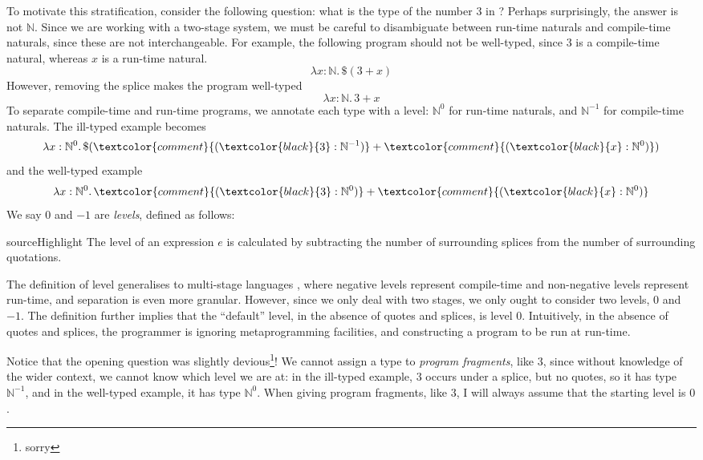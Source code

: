   To motivate this stratification, consider the following question: what is the type of the number $3$ in \sourceLang{}? Perhaps surprisingly, the answer is not $\mathbb{N}$. Since we are working with a two-stage system, we must be careful to disambiguate between run-time naturals and compile-time naturals, since these are not interchangeable. For example, the following program should not be well-typed, since $3$ is a compile-time natural, whereas $x$ is a run-time natural. 
  \[\lambda x: \mathbb{N}. \, \$(3 + x)\]
  However, removing the splice makes the program well-typed
  \[\lambda x: \mathbb{N}. \, 3 + x\]
  To separate compile-time and run-time programs, we annotate each type with a level: $\mathbb{N}^0$ for run-time naturals, and $\mathbb{N}^{-1}$ for compile-time naturals. The ill-typed example becomes
  \[\lambda x: \mathbb{N}^0. \, \$(\textcolor{comment}{(\textcolor{black}{3}:\mathbb{N}^{-1})} + \textcolor{comment}{(\textcolor{black}{x}:\mathbb{N}^{0})})\]
  and the well-typed example 
  \[\lambda x: \mathbb{N}^0. \, \textcolor{comment}{(\textcolor{black}{3}:\mathbb{N}^{0})} + \textcolor{comment}{(\textcolor{black}{x}:\mathbb{N}^{0})}\]
  We say $0$ and $-1$ are \textit{levels}, defined as follows:

  \begin{definition}[Level]{sourceHighlight}
    The level of an expression $e$ is calculated by subtracting the number of surrounding splices from the number of surrounding quotations.
  \end{definition}

  The definition of level generalises to multi-stage languages \citep{xie-2023}, where negative levels represent compile-time and non-negative levels represent run-time, and separation is even more granular. However, since we only deal with two stages, we only ought to consider two levels, $0$ and $-1$. The definition further implies that the ``default'' level, in the absence of quotes and splices, is level $0$. Intuitively, in the absence of quotes and splices, the programmer is ignoring metaprogramming facilities, and constructing a program to be run at run-time. 
  
  Notice that the opening question was slightly devious\footnote{sorry}! We cannot assign a type to \textit{program fragments}, like $3$, since without knowledge of the wider context, we cannot know which level we are at: in the ill-typed example, $3$ occurs under a splice, but no quotes, so it has type $\mathbb{N}^{-1}$, and in the well-typed example, it has type $\mathbb{N}^0$. When giving program fragments, like $3$, I will always assume that the starting level is $0$. 

